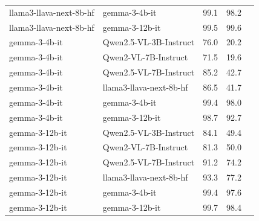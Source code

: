 \documentclass[11pt]{article}
\begin{document}
\begin{table}[htbp]
{\begin{tabular}{lllll}
llama3-llava-next-8b-hf & gemma-3-4b-it & 99.1 & 98.2 \\
llama3-llava-next-8b-hf & gemma-3-12b-it & 99.5 & 99.6 \\
\midrule
gemma-3-4b-it & Qwen2.5-VL-3B-Instruct & 76.0 & 20.2 \\
gemma-3-4b-it & Qwen2-VL-7B-Instruct & 71.5 & 19.6 \\
gemma-3-4b-it & Qwen2.5-VL-7B-Instruct & 85.2 & 42.7 \\
gemma-3-4b-it & llama3-llava-next-8b-hf & 86.5 & 41.7 \\
gemma-3-4b-it & gemma-3-4b-it & 99.4 & 98.0 \\
gemma-3-4b-it & gemma-3-12b-it & 98.7 & 92.7 \\
\midrule
gemma-3-12b-it & Qwen2.5-VL-3B-Instruct & 84.1 & 49.4 \\
gemma-3-12b-it & Qwen2-VL-7B-Instruct & 81.3 & 50.0 \\
gemma-3-12b-it & Qwen2.5-VL-7B-Instruct & 91.2 & 74.2 \\
gemma-3-12b-it & llama3-llava-next-8b-hf & 93.3 & 77.2 \\
gemma-3-12b-it & gemma-3-4b-it & 99.4 & 97.6 \\
gemma-3-12b-it & gemma-3-12b-it & 99.7 & 98.4 \\
\bottomrule
\end{tabular}
}
\end{table}
\end{document}
